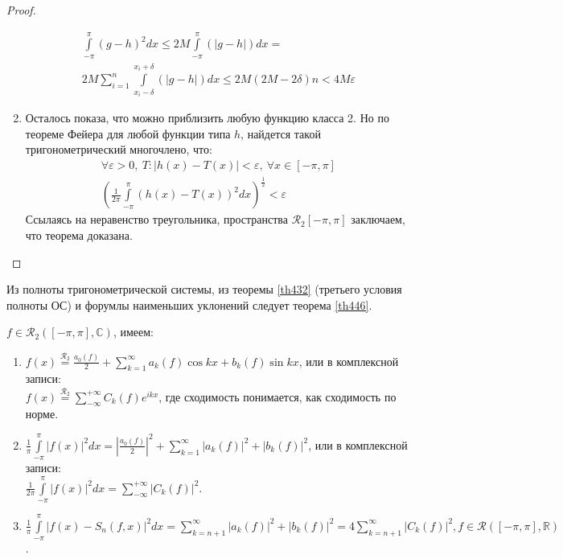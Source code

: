 \begin{proof}
\begin{enumerate}
\begin{gather}
          \int\limits_{-\pi}^\pi (g - h)^2 dx \leq 2M
          \int\limits_{-\pi}^\pi (|g - h|) dx = \\ 2M \sum\limits_{i = 1}^{n}
          \int\limits_{x_i - \delta}^{x_i + \delta} (|g - h|)dx \leq 2M (2M -
          2\delta)n < 4M\varepsilon
        \end{gather}
      \item Осталось показа, что можно приблизить любую функцию класса 2. Но по
        теореме Фейера для любой функции типа $h$, найдется такой
        тригонометрический многочлено, что:
        \begin{gather*}
          \forall \varepsilon > 0, \ T: |h(x) - T(x)| < \varepsilon, \ \forall
          x \in [-\pi, \pi] \\
          \left(\frac{1}{2\pi} \int\limits_{-\pi}^\pi (h(x) - T(x))^2 dx
          \right)^{\frac{1}{2}} < \varepsilon
        \end{gather*}
        Ссылаясь на неравенство треугольника, пространства $\mathcal{R_2}[-\pi, \pi]$
        заключаем, что теорема доказана.
  \end{enumerate}
\end{proof}

Из полноты тригонометрической системы, из теоремы \eqref{th432} (третьего
условия полноты ОС) и форумлы наименьших уклонений следует теорема
\eqref{th446}.

\begin{theorem}
  \label{th446}
  $f \in \mathcal{R}_2([-\pi, \pi], \mathbb{C})$, имеем:
  \begin{enumerate}
    \item $f(x) \overset{\mathcal{R}_2}=\frac{a_0(f)}{2} + \sum\limits_{k = 1}^{\infty}
      a_k(f) \cos kx + b_k(f) \sin kx$, или в комплексной записи: \\
      $f(x) \overset{\mathcal{R}_2}= \sum\limits_{-\infty}^{+\infty} C_k(f) e^{ikx}$, где
      сходимость понимается, как сходимость по норме.
    \item $\frac{1}{\pi} \int\limits_{-\pi}^\pi |f(x)|^2 dx =
      |\frac{a_0(f)}{2}|^2 + \sum\limits_{k = 1}^{\infty} |a_k(f)|^2 +
      |b_k(f)|^2$, или в комплексной записи:\\
      $\frac{1}{2\pi} \int\limits_{-\pi}^\pi |f(x)|^2 dx =
      \sum\limits_{-\infty}^{+\infty} |C_k(f)|^2$.
    \item $\frac{1}{\pi}\int\limits_{-\pi}^\pi |f(x) - S_n(f, x)|^2 dx =
      \sum\limits_{k = n + 1}^{\infty} |a_k(f)|^2 + |b_k(f)|^2 = 4
      \sum\limits_{k = n + 1}^{\infty} |C_k(f)|^2, f \in \mathcal{R}([-\pi, \pi],
      \mathbb{R})$.
  \end{enumerate}
\end{theorem}

